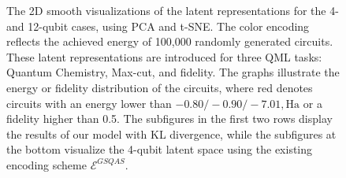 \documentclass{article} %
\begin{document}
\begin{figure}[ht]
    \caption{The 2D smooth visualizations of the latent representations for the 4- and 12-qubit cases, using PCA and t-SNE. The color encoding reflects the achieved energy of 100,000 randomly generated circuits. These latent representations are introduced for three QML tasks: Quantum Chemistry, Max-cut, and fidelity. The graphs illustrate the energy or fidelity distribution of the circuits, where red denotes circuits with an energy lower than $-0.80/-0.90/-7.01 , \text{Ha}$ or a fidelity higher than 0.5. The subfigures in the first two rows display the results of our model with KL divergence, while the subfigures at the bottom visualize the 4-qubit latent space using the existing encoding scheme $\mathcal{E}^{GSQAS}$.}
    \label{2D-Visu}
\end{figure}

\end{document}
